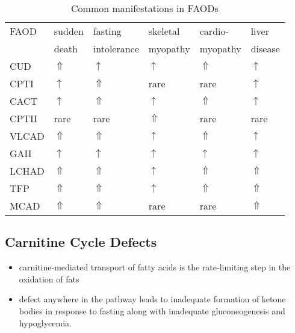 \documentclass[12pt]{scrartcl}
\begin{document}
\begin{table}[htbp]
\caption{\label{tab:orgffbe20e}Common manifestations in FAODs}
\centering
\begin{tabular}{llllll}
FAOD & sudden & fasting & skeletal & cardio- & liver\\
 & death & intolerance & myopathy & myopathy & disease\\
\hline
CUD & \(\Uparrow\) & \(\uparrow\) & \(\uparrow\) & \(\Uparrow\) & \(\uparrow\)\\
CPTI & \(\uparrow\) & \(\Uparrow\) & rare & rare & \(\uparrow\)\\
CACT & \(\uparrow\) & \(\Uparrow\) & \(\uparrow\) & \(\Uparrow\) & \(\uparrow\)\\
CPTII & rare & rare & \(\Uparrow\) & rare & rare\\
VLCAD & \(\Uparrow\) & \(\Uparrow\) & \(\uparrow\) & \(\Uparrow\) & \(\uparrow\)\\
GAII & \(\uparrow\) & \(\uparrow\) & \(\uparrow\) & \(\uparrow\) & \(\uparrow\)\\
LCHAD & \(\Uparrow\) & \(\Uparrow\) & \(\uparrow\) & \(\Uparrow\) & \(\Uparrow\)\\
TFP & \(\Uparrow\) & \(\Uparrow\) & \(\uparrow\) & \(\Uparrow\) & \(\Uparrow\)\\
MCAD & \(\Uparrow\) & \(\Uparrow\) & rare & rare & \(\Uparrow\)\\
\end{tabular}
\end{table}

\subsection{Carnitine Cycle Defects}
\label{sec:orgfc254c0}
\begin{itemize}
\item carnitine-mediated transport of fatty acids is the rate-limiting
step in the oxidation of fats
\item defect anywhere in the pathway leads to inadequate formation of
ketone bodies in response to fasting along with inadequate
gluconeogenesis and hypoglycemia.
\end{itemize}
\end{document}
